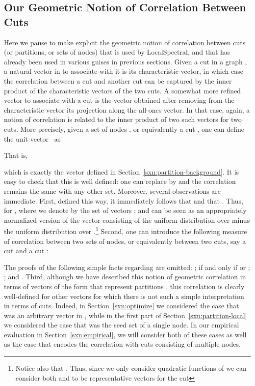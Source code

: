 \documentclass[11pt]{article}
\begin{document}
\subsection{Our Geometric Notion of Correlation Between Cuts}
\label{sxn:partition-geometric}


Here we pause to make explicit the geometric notion of correlation between 
cuts (or partitions, or sets of nodes) that is used by \textsf{LocalSpectral}, 
and that has already been used in various guises in previous sections.
Given a cut  in a graph , a natural vector in 
 to associate with it is its characteristic vector, in which
case the correlation between a cut  and another cut 
 can be captured by the inner product of the characteristic 
vectors of the two cuts. 
A somewhat more refined vector to associate with a cut is the vector 
obtained after removing from the characteristic vector its projection along 
the all-ones vector.  
In that case, again, a notion of correlation is related to the inner product 
of two such vectors for two cuts. 
More precisely, given a set of nodes , or equivalently a cut 
, one can define the unit vector ~as

That is, 

which is exactly the vector defined in Section~\ref{sxn:partition-background}.
It is easy to check that this is well defined: one can replace  by 
 and the correlation remains the same with any other set. 
Moreover, several observations are immediate.
First, defined this way, it immediately follows that 
 and that . 
Thus,  for , where we denote by 
 the set of vectors ;
and  can be seen as an appropriately normalized version of the vector 
consisting of the uniform distribution over  minus the uniform 
distribution over .\footnote{Notice also that .  Thus, since 
we only consider quadratic functions of  we 
can consider both  and  to be representative vectors for 
the cut  }
Second, one can introduce the following measure of correlation between two 
sets of nodes, or equivalently between two cuts, say a cut  
and a cut :

The proofs of the following simple facts regarding  are omitted:
;
 if and only if  or ;
; and
.
Third, although we have described this notion of geometric correlation in 
terms of vectors of the form  that represent 
partitions , this correlation is clearly well-defined for other 
vectors  for which there is not such a simple 
interpretation in terms of cuts.
Indeed, in Section~\ref{sxn:optimize} we considered the case that  was 
an arbitrary vector in , while in the first part of 
Section~\ref{sxn:partition-local} we considered the case that  was the 
seed set of a single node.
In our empirical evaluation in Section~\ref{sxn:empirical}, we will 
consider both of these cases as well as the case that  encodes the 
correlation with cuts consisting of multiple nodes.
\end{document}

